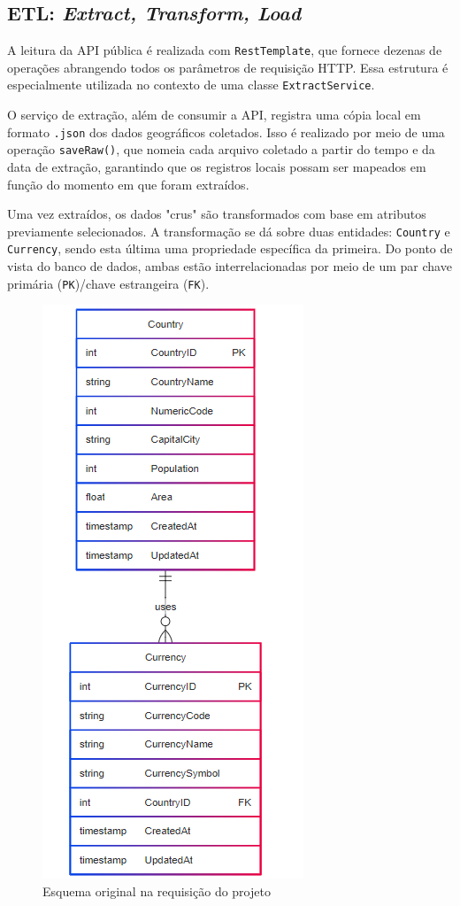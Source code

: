 \documentclass[12pt]{article}
\begin{document}
\subsection{ETL: \emph{Extract, Transform, Load}}
A leitura da API pública é realizada com \texttt{RestTemplate}, que fornece dezenas de operações abrangendo todos os parâmetros de requisição HTTP. Essa estrutura é especialmente utilizada no contexto de uma classe \texttt{ExtractService}.

\quad O serviço de extração, além de consumir a API, registra uma cópia local em formato \texttt{.json} dos dados geográficos coletados. Isso é realizado por meio de uma operação \texttt{saveRaw()}, que nomeia cada arquivo coletado a partir do tempo e da data de extração, garantindo que os registros locais possam ser mapeados em função do momento em que foram extraídos.

\quad Uma vez extraídos, os dados "crus" são transformados com base em atributos previamente selecionados. A transformação se dá sobre duas entidades: \texttt{Country} e \texttt{Currency}, sendo esta última uma propriedade específica da primeira. Do ponto de vista do banco de dados, ambas estão interrelacionadas por meio de um par chave primária (\texttt{PK})/chave estrangeira (\texttt{FK}).

\begin{figure}[H]
\centering
\includegraphics[scale=0.5]{assets/Diagram.png}
\caption{Esquema original na requisição do projeto}
\end{figure}
\end{document}
